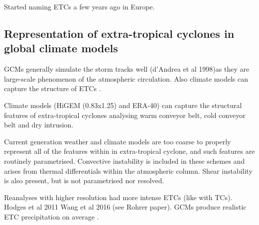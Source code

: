 Started naming ETCs a few years ago in Europe.



\subsection {Representation of extra-tropical cyclones in global climate models}

GCMs generally simulate the storm tracks well (d'Andrea et al 1998)as they are large-scale phenomenon of the atmospheric circulation. Also climate models can capture the structure of ETCs \citep{catto2010can}.

Climate models (HiGEM (0.83x1.25) and ERA-40) can capture the structural features of extra-tropical cyclones \citep{catto2010can} analysing warm conveyor belt, cold conveyor belt and dry intrusion.

Current generation weather and climate models are too coarse to properly represent all of the features within in extra-tropical cyclone, and such features are routinely parametrised. Convective instability is included in these schemes and arises from thermal differentials within the atmospheric column. Shear instability is also present, but is not parametrised nor resolved.

Reanalyses with higher resolution had more intense ETCs (like with TCs). Hodges et al 2011 Wang et al 2016 (see Rohrer paper). 
GCMs produce realistic ETC precipitation on average \citet{booth2018evaluation}.